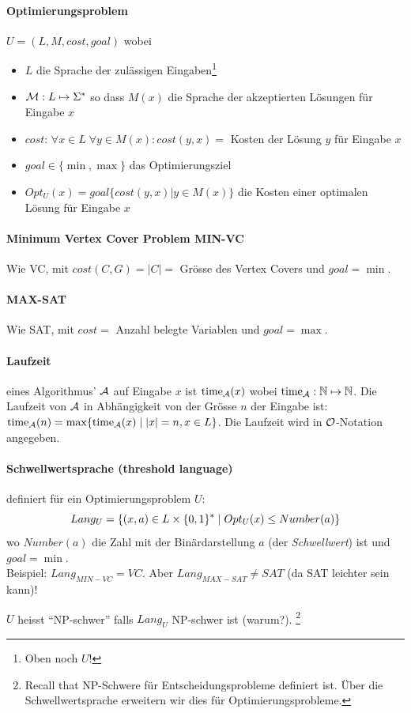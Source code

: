 \paragraph{Optimierungsproblem}
$U = (L, M, cost, goal)$ wobei
\begin{itemize}
    \item $L$ die Sprache der zulässigen Eingaben\footnote{Oben noch $U$!}
    \item $\mathcal{M}: L \mapsto \Sigma^*$ so dass $M(x)$ die Sprache der akzeptierten Lösungen für Eingabe $x$
    \item $cost$: $\forall x \in L \; \forall y \in M(x) : cost(y, x) = $ Kosten der Lösung $y$ für Eingabe $x$
    \item $goal \in \{ \min, \max \}$ das Optimierungsziel
    \item $Opt_U(x) = goal \{ cost(y, x) | y \in M(x) \}$ die Kosten einer optimalen Lösung für Eingabe $x$
\end{itemize}

\paragraph{Minimum Vertex Cover Problem MIN-VC}
Wie VC, mit $cost(C, G) = |C| = $ Grösse des Vertex Covers und $goal = \min$.

\paragraph{MAX-SAT}
Wie SAT, mit $cost = $ Anzahl belegte Variablen und $goal = \max$.

\paragraph{Laufzeit}
eines Algorithmus' $\mathcal{A}$ auf Eingabe $x$ ist $\text{time}_{\mathcal{A}} (x)$
wobei $\text{time}_{\mathcal{A}}: \mathbb{N} \mapsto \mathbb{N}$.
Die Laufzeit von $\mathcal{A}$ in Abhängigkeit von der Grösse $n$ der Eingabe ist:
$\text{time}_{\mathcal{A}} (n) = \max \{ \text{time}_{\mathcal{A}} (x) \; | \; |x| = n, x \in L \}$.
Die Laufzeit wird in  $\mathcal{O}$-Notation angegeben.

\paragraph{Schwellwertsprache (threshold language)} definiert für ein Optimierungsproblem $U$:
$$ Lang_U = \{ (x, a) \in L \times \lbrace 0, 1 \rbrace^* \; | \; Opt_U(x) \leq Number(a) \} $$
wo $Number(a)$ die Zahl mit der Binärdarstellung $a$ (der \emph{Schwellwert}) ist und $goal = \min$.
\\
Beispiel: $Lang_{MIN-VC} = VC$. Aber $Lang_{MAX-SAT} \neq SAT$ (da SAT leichter sein kann)!

$U$ heisst ``NP-schwer'' falls $Lang_U$ NP-schwer ist (warum?).%
\footnote{Recall that NP-Schwere für Entscheidungsprobleme definiert ist.
Über die Schwellwertsprache erweitern wir dies für Optimierungsprobleme.}

